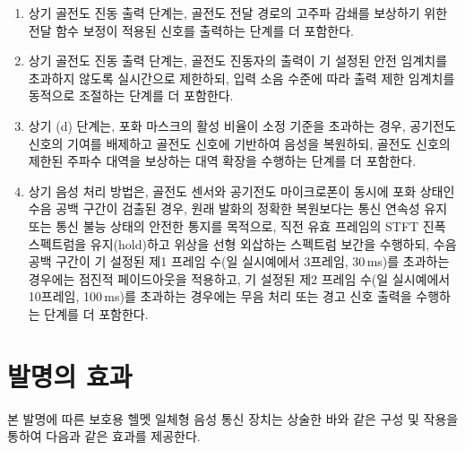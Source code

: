 \documentclass{article}
\begin{document}
\begin{enumerate}[label = \textbf{(M.2.\arabic*)}]
    \item 상기 골전도 진동 출력 단계는, 골전도 전달 경로의 고주파 감쇄를 보상하기 위한 전달 함수 보정이 적용된 신호를 출력하는 단계를 더 포함한다.

    \item 상기 골전도 진동 출력 단계는, 골전도 진동자의 출력이 기 설정된 안전 임계치를 초과하지 않도록 실시간으로 제한하되, 입력 소음 수준에 따라 출력 제한 임계치를 동적으로 조절하는 단계를 더 포함한다.

    \item 상기 (d) 단계는, 포화 마스크의 활성 비율이 
    소정 기준을 초과하는 경우, 공기전도 신호의 기여를 
    배제하고 골전도 신호에 기반하여 음성을 복원하되, 
    골전도 신호의 제한된 주파수 대역을 보상하는 대역 
    확장을 수행하는 단계를 더 포함한다.

    \item 상기 음성 처리 방법은, 골전도 센서와 
    공기전도 마이크로폰이 동시에 포화 상태인 수음 
    공백 구간이 검출된 경우, 원래 발화의 정확한 복원보다는 통신 연속성 유지 또는 통신 불능 상태의 안전한 통지를 목적으로, 직전 유효 프레임의 
    STFT 진폭 스펙트럼을 유지(hold)하고 위상을 선형 외삽하는 스펙트럼 보간을 수행하되, 수음 공백 구간이 기 설정된 제1 프레임 수(일 실시예에서 3프레임, 30\,ms)를 초과하는 경우에는 점진적 페이드아웃을 적용하고, 기 설정된 제2 프레임 수(일 실시예에서 10프레임, 100\,ms)를 초과하는 경우에는 무음 처리 또는 경고 신호 출력을 수행하는 
    단계를 더 포함한다.

\end{enumerate}

\section{발명의 효과}

본 발명에 따른 보호용 헬멧 일체형 음성 통신 장치는 상술한 바와 같은 
구성 및 작용을 통하여 다음과 같은 효과를 제공한다.
\end{document}
